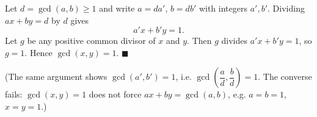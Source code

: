 Let $d=\gcd(a,b)\ge1$ and write $a=da'$, $b=db'$ with integers $a',b'$. Dividing $ax+by=d$ by $d$ gives
\[
a'x+b'y=1 .
\]
Let $g$ be any positive common divisor of $x$ and $y$. Then $g$ divides $a'x+b'y=1$, so $g=1$. Hence $\gcd(x,y)=1$. $\blacksquare$

(The same argument shows $\gcd(a',b')=1$, i.e. $\gcd\left(\dfrac{a}{d},\dfrac{b}{d}\right)=1$. The converse fails: $\gcd(x,y)=1$ does not force $ax+by=\gcd(a,b)$, e.g. $a=b=1$, $x=y=1$.)
